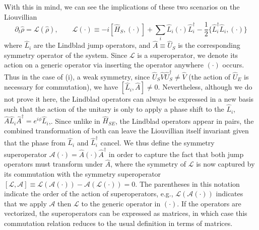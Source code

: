 \documentclass[11pt]{article}
\begin{document}
With this in mind, we can see the implications of these two scenarios on the Liouvillian 
\begin{equation}
    \partial_t \hat \rho = \mathcal{L}(\hat \rho), \qquad
    \mathcal{L}(\cdot) \equiv -i[\hat H_S,(\cdot)] + \sum_i \hat L_i(\cdot) \hat L_i^\dagger - \frac{1}{2} \{\hat L_i^\dagger \hat L_i, (\cdot)\}
\end{equation} 
where $\hat L_i$ are the Lindblad jump operators, and $\hat A \equiv \hat U_S$ is the corresponding symmetry operator of the system. Since $\mathcal{L}$ is a superoperator, we denote its action on a generic operator via inserting the operator anywhere $(\cdot)$ occurs. 
Thus in the case of (i), a weak symmetry, since $\hat U_S \hat V \hat U_S^\dagger \neq \hat V$ (the action of $\hat U_E$ is necessary for commutation), we have $[\hat L_i, \hat A] \neq 0$. Nevertheless, although we do not prove it here,  the Lindblad operators can always be expressed in a new basis such that the action of the unitary is only to apply a phase shift to the $\hat L_i$, $\hat A \hat L_i \hat A^\dagger = e^{i \phi} \hat L_i$,. 
Since unlike in $\hat H_{SE}$, the Lindblad operators appear in pairs,  the combined transformation of both can leave the Liouvillian itself invariant given that the phase from $\hat L_i$ and $\hat L_i^\dagger$ cancel. 
We thus define the symmetry superoperator $\mathcal{A}(\cdot) = \hat A (\cdot) \hat A^\dagger$ in order to capture the fact that both jump operators must transform under $\hat A$, where the symmetry of $\mathcal{L}$ is now captured by its commutation with the symmetry superoperator $[\mathcal{L},\mathcal{A}] \equiv \mathcal{L}(\mathcal{A}(\cdot)) - \mathcal{A}(\mathcal{L}(\cdot)) = 0$. The parentheses in this notation indicate the order of the action of superoperators, e.g., $\mathcal{L}(\mathcal{A}(\cdot))$ indicates that we apply $\mathcal{A}$ then $\mathcal{L}$ to the generic operator in $(\cdot)$. If the operators are vectorized, the superoperators can be expressed as matrices, in which case this commutation relation reduces to the usual definition in terms of matrices. 
\end{document}

